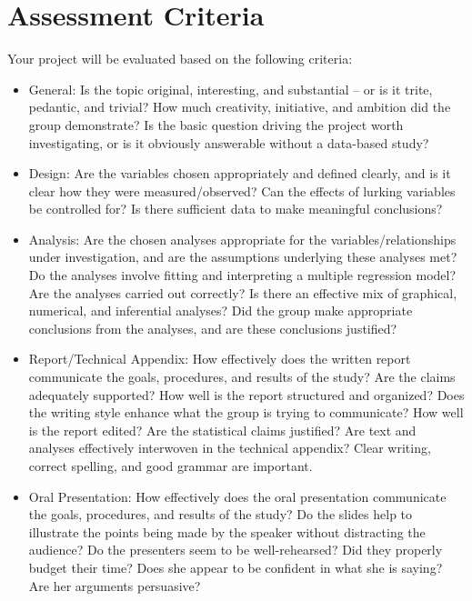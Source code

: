 \documentclass[10pt]{article}
\begin{document}
\section{Assessment Criteria}

Your project will be evaluated based on the following criteria:

	\begin{itemize}
		\item General: Is the topic original, interesting, and substantial -- or is it trite, pedantic, and trivial?  How much creativity, initiative, and ambition did the group demonstrate?  Is the basic question driving the project worth investigating, or is it obviously answerable without a data-based study?
		\item Design:  Are the variables chosen appropriately and defined clearly, and is it clear how they were measured/observed?  Can the effects of lurking variables be controlled for?  Is there sufficient data to make meaningful conclusions? 
		\item Analysis:  Are the chosen analyses appropriate for the variables/relationships under investigation, and are the assumptions underlying these analyses met?  Do the analyses involve fitting and interpreting a multiple regression model?  Are the analyses carried out correctly?  Is there an effective mix of graphical, numerical, and inferential analyses?  Did the group make appropriate conclusions from the analyses, and are these conclusions justified?
		\item Report/Technical Appendix:  How effectively does the written report communicate the goals, procedures, and results of the study?  Are the claims adequately supported? How well is the report structured and organized? Does the writing style enhance what the group is trying to communicate?  How well is the report edited? Are the statistical claims justified? Are text and analyses effectively interwoven in the technical appendix? Clear writing, correct spelling, and good grammar are important.
		\item Oral Presentation: How effectively does the oral presentation communicate the goals, procedures, and results of the study? Do the slides help to illustrate the points being made by the speaker without distracting the audience? Do the presenters seem to be well-rehearsed? Did they properly budget their time? Does she appear to be confident in what she is saying? Are her arguments persuasive? 
	\end{itemize}
\end{document}
